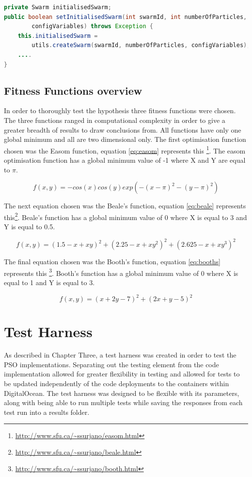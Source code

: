 \documentclass[oneside,12pt]{book}
\begin{document}
\begin{lstlisting}[basicstyle=\footnotesize, language=Java]
private Swarm initialisedSwarm;
public boolean setInitialisedSwarm(int swarmId, int numberOfParticles, ConfigVariables         
        configVariables) throws Exception {
    this.initialisedSwarm = 
        utils.createSwarm(swarmId, numberOfParticles, configVariables);
    ....
}
\end{lstlisting}
\label{listing:Distributedinitialisation}

\subsection{Fitness Functions overview}
In order to thoroughly test the hypothesis three fitness functions were chosen. The three functions ranged in computational complexity in order to give a greater breadth of results to draw conclusions from. All functions have only one global minimum and all are two dimensional only. The first optimisation function chosen was the Easom function, equation \ref{eq:easom} represents this \footnote{\url{http://www.sfu.ca/~ssurjano/easom.html}}. The easom optimisation function has a global minimum value of -1 where X and Y are equal to $\pi$. 

\begin{equation}\label{eq:easom}
f(x,y)=-cos(x)cos(y)exp(-(x-\pi)^2-(y-\pi)^2)
\end{equation}

The next equation chosen was the Beale's function, equation \ref{eq:beale} represents this\footnote{\url{http://www.sfu.ca/~ssurjano/beale.html}}. Beale's function has a global minimum value of 0 where X is equal to 3 and Y is equal to 0.5. 

\begin{equation}\label{eq:beale}
f(x, y) = (1.5-x+xy)^2+(2.25-x+xy^2)^2+(2.625-x+xy^3)^2
\end{equation}

The final equation chosen was the Booth's function, equation \ref{eq:booths} represents this \footnote{\url{http://www.sfu.ca/~ssurjano/booth.html}}. Booth's function has a global minimum value of 0 where X is equal to 1 and Y is equal to 3. 

\begin{equation}\label{eq:booths}
f(x,y)=(x+2y-7)^2+(2x+y-5)^2
\end{equation}


\section{Test Harness}
As described in Chapter Three, a test harness was created in order to test the PSO implementations. Separating out the testing element from the code implementation allowed for greater flexibility in testing and allowed for tests to be updated independently of the code deployments to the containers within DigitalOcean. The test harness was designed to be flexible with its parameters, along with being able to run multiple tests while saving the responses from each test run into a results folder.
\end{document}
